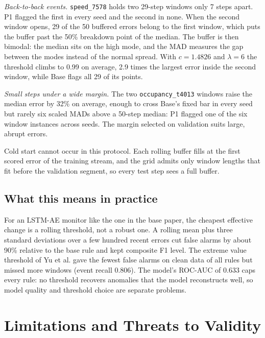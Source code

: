 \documentclass[conference]{IEEEtran}
\begin{document}
\emph{Back-to-back events.} \texttt{speed\_7578} holds two 29-step windows only 7 steps apart. P1 flagged the first in every seed and the second in none. When the second window opens, 29 of the 50 buffered errors belong to the first window, which puts the buffer past the 50\% breakdown point of the median. The buffer is then bimodal: the median sits on the high mode, and the MAD measures the gap between the modes instead of the normal spread. With $c = 1.4826$ and $\lambda = 6$ the threshold climbs to 0.99 on average, 2.9 times the largest error inside the second window, while Base flags all 29 of its points.

\emph{Small steps under a wide margin.} The two \texttt{occupancy\_t4013} windows raise the median error by 32\% on average, enough to cross Base's fixed bar in every seed but rarely six scaled MADs above a 50-step median: P1 flagged one of the six window instances across seeds. The margin selected on validation suits large, abrupt errors.

Cold start cannot occur in this protocol. Each rolling buffer fills at the first scored error of the training stream, and the grid admits only window lengths that fit before the validation segment, so every test step sees a full buffer.

\subsection{What this means in practice}
For an LSTM-AE monitor like the one in the base paper, the cheapest effective change is a rolling threshold, not a robust one. A rolling mean plus three standard deviations over a few hundred recent errors cut false alarms by about 90\% relative to the base rule and kept composite F1 level. The extreme value threshold of Yu et al. \cite{yu2024evt} gave the fewest false alarms on clean data of all rules but missed more windows (event recall 0.806). The model's ROC-AUC of 0.633 caps every rule: no threshold recovers anomalies that the model reconstructs well, so model quality and threshold choice are separate problems.

\section{Limitations and Threats to Validity}
\end{document}

